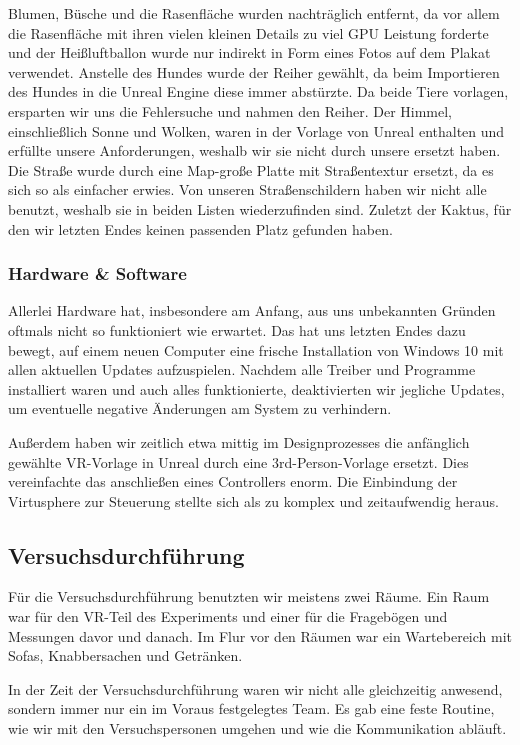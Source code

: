 \documentclass{Bericht}
\begin{document}
		Blumen, Büsche und die Rasenfläche wurden nachträglich entfernt, da vor allem die Rasenfläche mit ihren vielen kleinen Details zu viel GPU Leistung forderte und der Heißluftballon wurde nur indirekt in Form eines Fotos auf dem Plakat verwendet. 
 		Anstelle des Hundes wurde der Reiher gewählt, da beim Importieren des Hundes in die Unreal Engine diese immer abstürzte. Da beide Tiere vorlagen, ersparten wir uns die Fehlersuche und nahmen den Reiher. 
		Der Himmel, einschließlich Sonne und Wolken, waren in der Vorlage von Unreal enthalten und erfüllte unsere Anforderungen, weshalb wir sie nicht durch unsere ersetzt haben. 
		Die Straße wurde durch eine Map-große Platte mit Straßentextur ersetzt, da es sich so als einfacher erwies. 
		Von unseren Straßenschildern haben wir nicht alle benutzt, weshalb sie in beiden Listen wiederzufinden sind. 
		Zuletzt der Kaktus, für den wir letzten Endes keinen passenden Platz gefunden haben. \\

		
		\subsubsection{Hardware \& Software}
			Allerlei Hardware hat, insbesondere am Anfang, aus uns unbekannten Gründen oftmals nicht so funktioniert wie erwartet. Das hat uns letzten Endes dazu bewegt, auf einem neuen Computer eine frische Installation von Windows 10 mit allen aktuellen Updates aufzuspielen. Nachdem alle Treiber und Programme installiert waren und auch alles funktionierte, deaktivierten wir jegliche Updates, um eventuelle negative Änderungen am System zu verhindern. 
			
			Außerdem haben wir zeitlich etwa mittig im Designprozesses die anfänglich gewählte VR-Vorlage in Unreal durch eine 3rd-Person-Vorlage ersetzt. Dies vereinfachte das anschließen eines Controllers enorm. Die Einbindung der Virtusphere zur Steuerung stellte sich als zu komplex und zeitaufwendig heraus. 
		
	\subsection{Versuchsdurchführung} %
		Für die Versuchsdurchführung benutzten wir meistens zwei Räume. Ein Raum war für den VR-Teil des Experiments und einer für die Fragebögen und Messungen davor und danach. Im Flur vor den Räumen war ein Wartebereich mit Sofas, Knabbersachen und Getränken. 
		
		In der Zeit der Versuchsdurchführung waren wir nicht alle gleichzeitig anwesend, sondern immer nur ein im Voraus festgelegtes Team. Es gab eine feste Routine, wie wir mit den Versuchspersonen umgehen und wie die Kommunikation abläuft. 		
\end{document}
